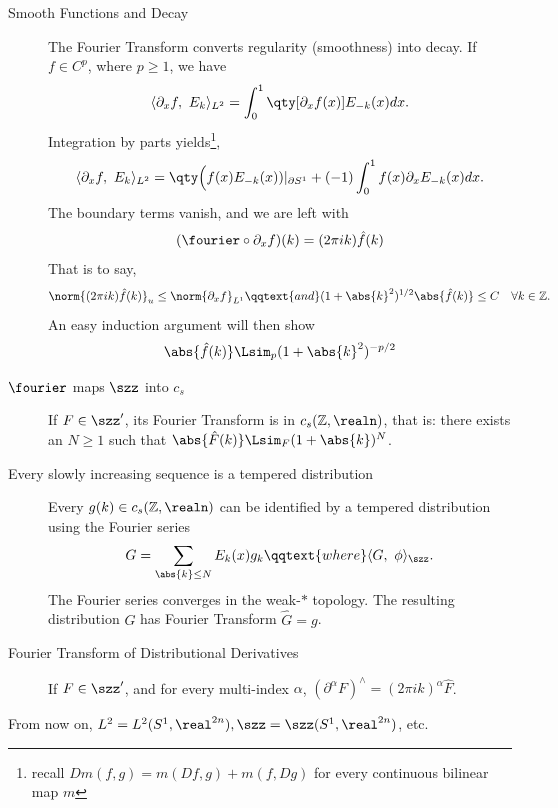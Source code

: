 \documentclass[../main-v2-manifolds.tex]{subfiles}
\begin{document}
\begin{description}
    \item[Smooth Functions and Decay]
    The Fourier Transform converts regularity (smoothness) into decay. If $f\in C^p$, where $p\geq 1$, we have
    \[
        \langle \partial_x f,\ E_{k}\rangle_{L^2} = \int_0^1 \qty[\partial_x f(x)]E_{-k}(x)dx.
    \]
    Integration by parts yields\footnote{recall $Dm(f,g) = m(Df,g) + m(f,Dg)$ for every continuous bilinear map $m$},
    \[
        \langle \partial_x f,\ E_{k}\rangle_{L^2} = \qty\Big(f(x)E_{-k}(x))\vert_{\partial S^1} + (-1)\int_0^1 f(x)\partial_x E_{-k}(x)dx.
    \]
    The boundary terms vanish, and we are left with
    \[
        (\fourier \circ \partial_x f)(k) = (2\pi i k)\hat{f}(k)
    \]
    That is to say, 
    \[
        \norm{(2\pi i k)\hat{f}(k)}_{u}\leq \norm{\partial_x f}_{L^1}\qqtext{and}(1+\abs{k}^2)^{1/2}\abs{\hat{f}(k)}\leq C\quad\forall k\in\mathbb{Z}.
    \]
    An easy induction argument will then show
    \[
        \abs{\hat{f}(k)}\Lsim_{p} (1+\abs{k}^2)^{-p/2}
    \]
    \item[$\fourier$ maps $\szz$ into $c_s$] If $F\in\szz'$, its Fourier Transform is in $c_s(\mathbb{Z},\realn)$, that is: there exists an $N\geq 1$ such that $\abs{\hat{F}(k)}\Lsim_{F}(1+\abs{k})^N$. 
    \item[Every slowly increasing sequence is a tempered distribution] Every $g(k)\in c_s(\mathbb{Z},\realn)$ can be identified by a tempered distribution using the Fourier series
    \[
        G = \sum_{\abs{k}\leq N}E_k(x)g_k\qqtext{where}\langle G,\ \phi\rangle_{\szz}.
    \]
    The Fourier series converges in the weak-$\ast$ topology. The resulting distribution $G$ has Fourier Transform $\hat{G} = g$.
    \item[Fourier Transform of Distributional Derivatives]
    If $F\in\szz'$, and for every multi-index $\alpha$, $(\partial^\alpha F)^{\wedge} = (2\pi i k)^{\alpha}\hat{F}$.
\end{description}
\begin{remark}
    From now on, $L^2 = L^2(S^1,\realtn), \szz = \szz(S^1,\realtn)$, etc.
\end{remark}
\end{document}

